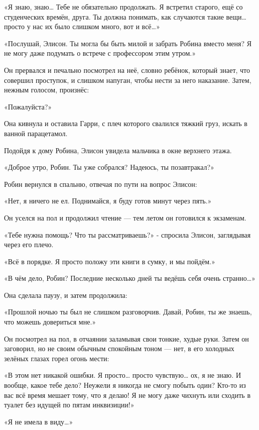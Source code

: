 \documentclass[a4paper,12pt]{book}
\begin{document}
«Я знаю, знаю… Тебе не обязательно продолжать. Я встретил старого, ещё со студенческих времён, друга. Ты должна понимать, как случаются такие вещи… просто у нас их было слишком много, вот и всё…»
\par
«Послушай, Элисон. Ты могла бы быть милой и забрать Робина вместо меня? Я не могу даже подумать о встрече с профессором этим утром.»
\par
Он прервался и печально посмотрел на неё, словно ребёнок, который знает, что совершил проступок, и слишком напуган, чтобы нести за него наказание. Затем, нежным голосом, произнёс:
\par
«Пожалуйста?»
\par
Она кивнула и оставила Гарри, с плеч которого свалился тяжкий груз, искать в ванной парацетамол.\\
\par
Подойдя к дому Робина, Элисон увидела мальчика в окне верхнего этажа.
\par
«Доброе утро, Робин. Ты уже собрался? Надеюсь, ты позавтракал?»
\par
Робин вернулся в спальню, отвечая по пути на вопрос Элисон:
\par
«Нет, я ничего не ел. Поднимайся, я буду готов минут через пять.»
\par
Он уселся на пол и продолжил чтение — тем летом он готовился к экзаменам.
\par
«Тебе нужна помощь? Что ты рассматриваешь?» - спросила Элисон, заглядывая через его плечо.
\par
«Всё в порядке. Я просто положу эти книги в сумку, и мы пойдём.»
\par
«В чём дело, Робин? Последние несколько дней ты ведёшь себя очень странно…»
\par
Она сделала паузу, и затем продолжила:
\par
«Прошлой ночью ты был не слишком разговорчив. Давай, Робин, ты же знаешь, что можешь довериться мне.»
\par
Он посмотрел на пол, в отчаянии заламывая свои тонкие, худые руки. Затем он заговорил, но не своим обычным спокойным тоном — нет, в его холодных зелёных глазах горел огонь мести:
\par
«В этом нет никакой ошибки. Я просто… просто чувствую… ох, я не знаю. И вообще, какое тебе дело? Неужели я никогда не смогу побыть один? Кто-то из вас всё время мешает тому, что я делаю! Я не могу даже чихнуть или сходить в туалет без идущей по пятам инквизиции!»
\par
«Я не имела в виду…»
\par
\end{document}
